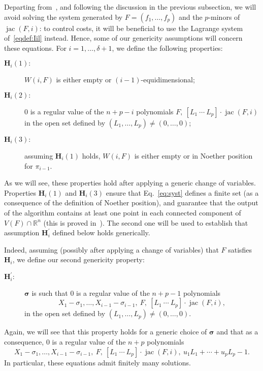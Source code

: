 \documentclass[12pt]{article}
\DeclareMathOperator{\jac}{jac}
\def\R{\mathbb{R}}
\begin{document}
Departing from~\cite{EMP}, and following the discussion in the
previous subsection, we will avoid solving the system generated by
$F=(f_1,\dots,f_p)$ and the $p$-minors of $\jac(F, i)$: to control
costs, it will be beneficial to use the Lagrange system
of~\eqref{eqdef:Iil} instead. Hence, some of our genericity
assumptions will concern these equations. For $i=1,\dots,\delta+1$, we
define the following properties:
\begin{description}
\item [$\bm H_i(1):$] $W(i,F)$ is either empty or $(i-1)$-equidimensional;
\item [$\bm H_i(2):$] $0$ is a regular value of the $n+p-i$ polynomials
  $F,\ [L_1~\cdots~L_p]\cdot \jac(F, i)$ in the open set defined by
  $(L_1,\dots,L_p) \ne (0,\dots,0)$;
\item [$\bm H_i(3):$] assuming $\bm H_i(1)$ holds, $W(i,F)$ is either
  empty or in Noether position for $\pi_{i-1}$.
\end{description}
As we will see, these properties hold after applying a generic change
of variables. Properties $\bm H_i(1)$ and $\bm H_i(3)$ ensure that
Eq.~\eqref{eq:syst} defines a finite set (as a consequence of the
definition of Noether position), and guarantee that the output of the
algorithm contains at least one point in each connected component of
$V(F) \cap \R^n$ (this is proved in~\cite[Theorem~2]{EMP}). The second
one will be used to establish that assumption $\bm H^{'}_i$ defined
below holds generically.

Indeed, assuming (possibly after applying a change of variables) that
$F$ satisfies $\bm H_i$, we define our second genericity property:
\begin{description}
\item [$\bm H^{'}_i:$] $\bm \sigma$ is such that $0$ is a regular value of the $n+p-1$
  polynomials
  \[ X_1 - \sigma_1, \dots, X_{i-1} - \sigma_{i-1},\ F,\ [L_1~\cdots~L_p]\cdot \jac(F, i), \]
  in the open set defined by $(L_1,\dots,L_p) \ne (0,\dots,0)$.
\end{description}
Again, we will see that this property holds for a generic choice of
$\bm\sigma$ and that as a consequence, $0$ is a regular value of the
$n+p$ polynomials
\begin{equation}\label{eq:syst2}
  X_1 - \sigma_1, \dots, X_{i-1} - \sigma_{i-1},\ F,\ [L_1~\cdots~L_p]\cdot \jac(F, i),\ u_1 L_1 + \cdots + u_p L_p -1.
\end{equation}
In particular, these equations admit finitely many solutions.
\end{document}
